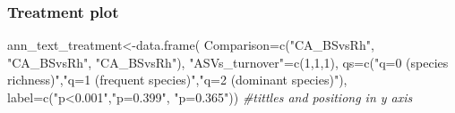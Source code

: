 \documentclass[]{interact}
\theoremstyle{plain}%
\theoremstyle{definition}
\theoremstyle{remark}
\newenvironment{Shaded}{\begin{snugshade}}{\end{snugshade}}
\newcommand{\AttributeTok}[1]{\textcolor[rgb]{0.77,0.63,0.00}{#1}}
\newcommand{\CommentTok}[1]{\textcolor[rgb]{0.56,0.35,0.01}{\textit{#1}}}
\newcommand{\DecValTok}[1]{\textcolor[rgb]{0.00,0.00,0.81}{#1}}
\newcommand{\FunctionTok}[1]{\textcolor[rgb]{0.00,0.00,0.00}{#1}}
\newcommand{\NormalTok}[1]{#1}
\newcommand{\OtherTok}[1]{\textcolor[rgb]{0.56,0.35,0.01}{#1}}
\newcommand{\StringTok}[1]{\textcolor[rgb]{0.31,0.60,0.02}{#1}}
\begin{document}
\hypertarget{treatment-plot}{%
\subsubsection{Treatment plot}\label{treatment-plot}}

\begin{Shaded}
\begin{Highlighting}[]
\NormalTok{ann\_text\_treatment}\OtherTok{\textless{}{-}}\FunctionTok{data.frame}\NormalTok{(}
  \AttributeTok{Comparison=}\FunctionTok{c}\NormalTok{(}\StringTok{"CA\_BSvsRh"}\NormalTok{, }\StringTok{"CA\_BSvsRh"}\NormalTok{, }\StringTok{"CA\_BSvsRh"}\NormalTok{),}
  \StringTok{"ASVs\_turnover"}\OtherTok{=}\FunctionTok{c}\NormalTok{(}\DecValTok{1}\NormalTok{,}\DecValTok{1}\NormalTok{,}\DecValTok{1}\NormalTok{),}
  \AttributeTok{qs=}\FunctionTok{c}\NormalTok{(}\StringTok{"q=0 (species richness)"}\NormalTok{,}\StringTok{"q=1 (frequent species)"}\NormalTok{,}\StringTok{"q=2 (dominant species)"}\NormalTok{),}
  \AttributeTok{label=}\FunctionTok{c}\NormalTok{(}\StringTok{"p\textless{}0.001"}\NormalTok{,}\StringTok{"p=0.399"}\NormalTok{, }\StringTok{"p=0.365"}\NormalTok{)) }\CommentTok{\#tittles and positiong in y axis}


\end{Highlighting}
\end{Shaded}
\end{document}
